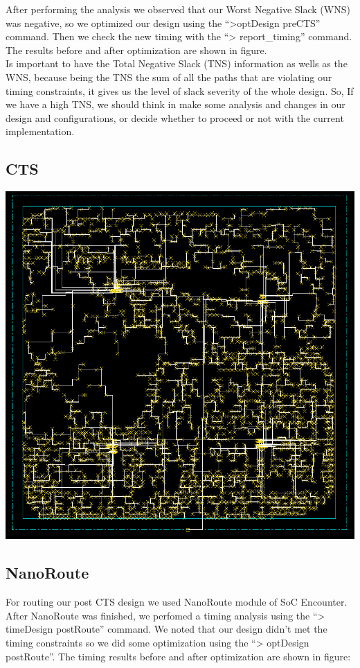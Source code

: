\documentclass[12pt]{article}
\begin{document}
After performing the analysis we observed that our Worst Negative Slack (WNS) was negative, so we optimized our design using the “>optDesign preCTS” command. Then we check the new timing with the “> report\_timing” command. The results before and after optimization are shown in figure.\\

Is important to have the Total Negative Slack (TNS) information as wells as the WNS, because being the TNS the sum of all the paths that are violating our timing constraints, it gives us the level of slack severity of the whole design. So, If we have a high TNS, we should think in make some analysis and changes in our design and configurations, or decide whether to proceed or not with the current implementation.\\

\subsection{CTS}
\begin{center}
\includegraphics[scale=0.4]{pic/true/clock_tree.png}
\end{center}
\subsection{NanoRoute}
For routing our post CTS design we used NanoRoute module of SoC Encounter. After NanoRoute was finished, we perfomed a timing analysis using the “> timeDesign postRoute” command. We noted that our design didn’t met the timing constraints so we did some optimization using the “> optDesign postRoute”. The timing results before and after optimization are shown in figure:
\end{document}
